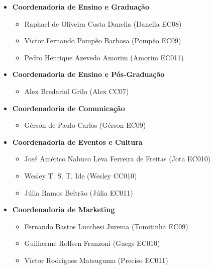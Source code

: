 \begin{itemize}
\item  \textbf{Coordenadoria de Ensino e Graduação}
\begin{itemize}
\item Raphael de Oliveira Costa Danella (Danella EC08)
\item Victor Fernando Pompêo Barbosa (Pompêo EC09)
\item Pedro Henrique Azevedo Amorim (Amorim EC011)
\end{itemize}
\end{itemize}

\begin{itemize}
\item  \textbf{Coordenadoria de Ensino e Pós-Graduação}
\begin{itemize}
\item Alex Bredariol Grilo (Alex CC07)
\end{itemize}
\end{itemize}

\begin{itemize}
\item  \textbf{Coordenadoria de Comunicação}
\begin{itemize}
\item  Gérson de Paulo Carlos (Gérson EC09)
\end{itemize}
\end{itemize}

\begin{itemize}
\item  \textbf{Coordenadoria de Eventos e Cultura}
\begin{itemize}
\item José Américo Nabuco Leva Ferreira de Freitas (Jota EC010)
\item Wesley T. S. T. Ide (Wesley CC010)
\item Júlia Ramos Beltrão (Júlia EC011)
\end{itemize}
\end{itemize}

\begin{itemize}
\item  \textbf{Coordenadoria de Marketing}
\begin{itemize}
\item Fernando Bastos Lucchesi Jurema (Tomitinha EC09)
\item Guilherme Rolfsen Franzoni (Guegs EC010)
\item Victor Rodrigues Matsuguma (Preciso EC011)
\end{itemize}
\end{itemize}

